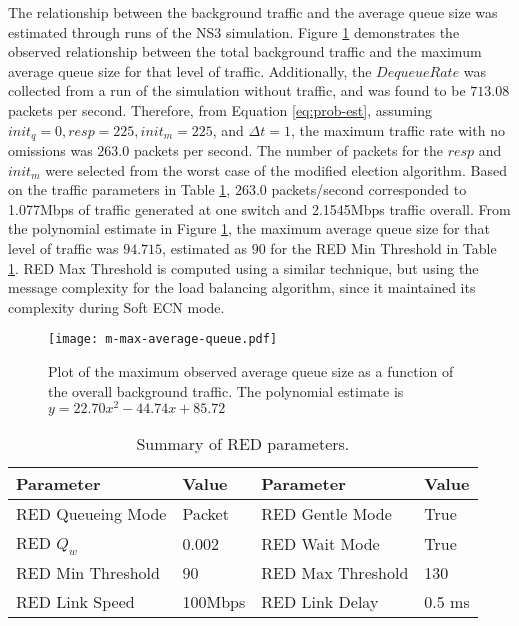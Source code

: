 The relationship between the background traffic and the average queue size was estimated through runs of the \ac{NS3} simulation.
Figure \ref{fig:plotm} demonstrates the observed relationship between the total background traffic and the maximum average queue size for that level of traffic.
Additionally, the $DequeueRate$ was collected from a run of the simulation without traffic, and was found to be $713.08$ packets per second.
Therefore, from Equation \ref{eq:prob-est}, assuming $init_q=0, resp=225, init_m=225$, and $\Delta t=1$, the maximum traffic rate with no omissions was $263.0$ packets per second.
The number of packets for the $resp$ and $init_m$ were selected from the worst case of the modified election algorithm.
Based on the traffic parameters in Table \ref{tab:red-parameters}, $263.0$ packets/second corresponded to 1.077Mbps of traffic generated at one switch and 2.1545Mbps traffic overall.
From the polynomial estimate in Figure \ref{fig:plotm}, the maximum average queue size for that level of traffic was $94.715$, estimated as $90$ for the \ac{RED} Min Threshold in Table \ref{tab:red-parameters}.
RED Max Threshold is computed using a similar technique, but using the message complexity for the load balancing algorithm, since it maintained its complexity during Soft ECN mode.

\begin{figure}
\centering
\texttt{[image: m-max-average-queue.pdf]}
\caption[Plot of the maximum observed average queue size as a function of the overall background traffic.]{Plot of the maximum observed average queue size as a function of the overall background traffic. The polynomial estimate is $y=22.70x^2-44.74x+85.72$}
\label{fig:plotm}
\end{figure}

\begin{table}
\centering
\caption{Summary of \ac{RED} parameters.}
    \label{tab:red-parameters}
\begin{tabular}{ | l | l || l | l | } \hline
Parameter & Value & Parameter & Value        \\ \hline
RED Queueing Mode & Packet & RED Gentle Mode & True    \\ \hline
RED $Q_{w}$ & 0.002 & RED Wait Mode & True      \\ \hline
RED Min Threshold & 90 & RED Max Threshold & 130   \\ \hline
RED Link Speed & 100Mbps & RED Link Delay & 0.5 ms   \\ \hline
\end{tabular}
\end{table}

